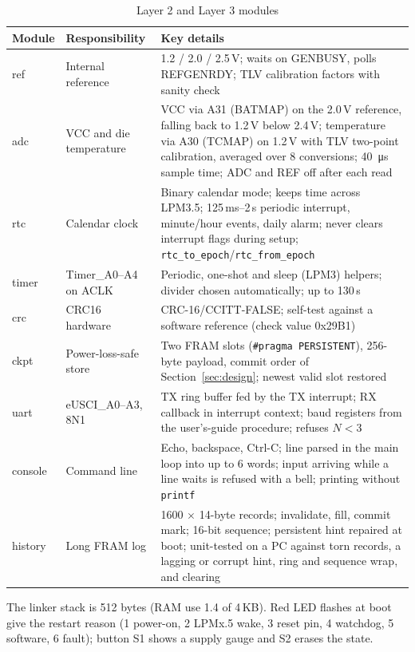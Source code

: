\documentclass[conference]{IEEEtran}
\newcommand{\code}[1]{\texttt{#1}}
\begin{document}
\begin{table}[H]
\centering\small
\caption{Layer 2 and Layer 3 modules}
\begin{tabularx}{\textwidth}{@{}llL@{}}
\toprule
Module & Responsibility & Key details \\
\midrule
ref & Internal reference & 1.2 / 2.0 / 2.5\,V; waits on GENBUSY, polls REFGENRDY; TLV calibration factors with sanity check \\
adc & VCC and die temperature & VCC via A31 (BATMAP) on the 2.0\,V reference, falling back to 1.2\,V below 2.4\,V; temperature via A30 (TCMAP) on 1.2\,V with TLV two-point calibration, averaged over 8 conversions; \SI{40}{\micro\second} sample time; ADC and REF off after each read \\
rtc & Calendar clock & Binary calendar mode; keeps time across LPM3.5; 125\,ms--2\,s periodic interrupt, minute/hour events, daily alarm; never clears interrupt flags during setup; \code{rtc\_to\_epoch}/\code{rtc\_from\_epoch} \\
timer & Timer\_A0--A4 on ACLK & Periodic, one-shot and sleep (LPM3) helpers; divider chosen automatically; up to 130\,s \\
crc & CRC16 hardware & CRC-16/CCITT-FALSE; self-test against a software reference (check value 0x29B1) \\
ckpt & Power-loss-safe store & Two FRAM slots (\code{\#pragma PERSISTENT}), 256-byte payload, commit order of Section~\ref{sec:design}; newest valid slot restored \\
uart & eUSCI\_A0--A3, 8N1 & TX ring buffer fed by the TX interrupt; RX callback in interrupt context; baud registers from the user's-guide procedure; refuses $N<3$ \\
console & Command line & Echo, backspace, Ctrl-C; line parsed in the main loop into up to 6 words; input arriving while a line waits is refused with a bell; printing without \code{printf} \\
history & Long FRAM log & 1600 $\times$ 14-byte records; invalidate, fill, commit mark; 16-bit sequence; persistent hint repaired at boot; unit-tested on a PC against torn records, a lagging or corrupt hint, ring and sequence wrap, and clearing \\
\bottomrule
\end{tabularx}
\end{table}

\noindent The linker stack is 512 bytes (RAM use 1.4 of 4\,KB). Red LED flashes at boot give the restart reason (1 power-on, 2 LPMx.5 wake, 3 reset pin, 4 watchdog, 5 software, 6 fault); button S1 shows a supply gauge and S2 erases the state.
\end{document}
